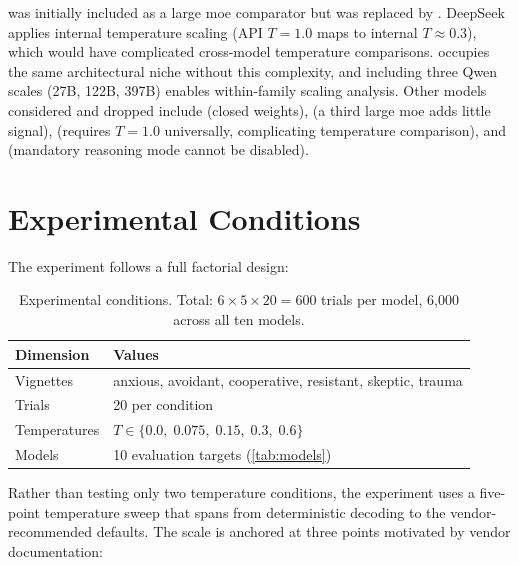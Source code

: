  was initially included as a large \gls{moe}
comparator but was replaced by . DeepSeek applies
internal temperature scaling (API $T = 1.0$ maps to internal $T \approx
0.3$), which would have complicated cross-model temperature comparisons.
 occupies the same architectural niche without
this complexity, and including three Qwen scales (27B, 122B, 397B) enables
within-family scaling analysis. Other models considered and dropped include
 (closed weights),
 (a third large \gls{moe} adds little signal),
 (requires $T = 1.0$ universally, complicating
temperature comparison), and  (mandatory reasoning mode
cannot be disabled).


\section{Experimental Conditions}
\label{sec:meth-conditions}

The experiment follows a full factorial design:

\begin{table}[t]
  \centering
  \caption{Experimental conditions. Total: $6 \times 5 \times 20 = 600$ trials per model, 6{,}000 across all ten models.}
  \label{tab:conditions}
  \begin{tabular}{ll}
    \toprule
    Dimension & Values \\
    \midrule
    Vignettes    & anxious, avoidant, cooperative, resistant, skeptic, trauma \\
    Trials       & 20 per condition \\
    Temperatures & $T \in \{0.0,\; 0.075,\; 0.15,\; 0.3,\; 0.6\}$ \\
    Models       & 10 evaluation targets (\autoref{tab:models}) \\
    \bottomrule
  \end{tabular}
\end{table}

Rather than testing only two temperature conditions, the experiment uses a
five-point temperature sweep that spans from deterministic decoding to the
vendor-recommended defaults. The scale is anchored at three points
motivated by vendor documentation:

